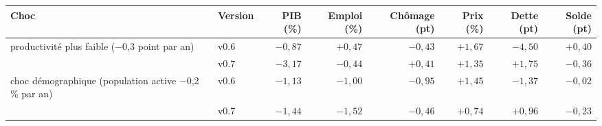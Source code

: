 \begin{tabular}{llrrrrrr}\toprule Choc & Version & PIB (\%) & Emploi (\%) & Chômage (pt) & Prix (\%) & Dette (pt) & Solde (pt)\\ \midrule
productivité plus faible (−0,3 point par an) & v0.6 & $-0{,}87$ & $+0{,}47$ & $-0{,}43$ & $+1{,}67$ & $-4{,}50$ & $+0{,}40$\\
 & v0.7 & $-3{,}17$ & $-0{,}44$ & $+0{,}41$ & $+1{,}35$ & $+1{,}75$ & $-0{,}36$\\
\addlinespace
choc démographique (population active −0,2 \% par an) & v0.6 & $-1{,}13$ & $-1{,}00$ & $-0{,}95$ & $+1{,}45$ & $-1{,}37$ & $-0{,}02$\\
 & v0.7 & $-1{,}44$ & $-1{,}52$ & $-0{,}46$ & $+0{,}74$ & $+0{,}96$ & $-0{,}23$\\\bottomrule\end{tabular}